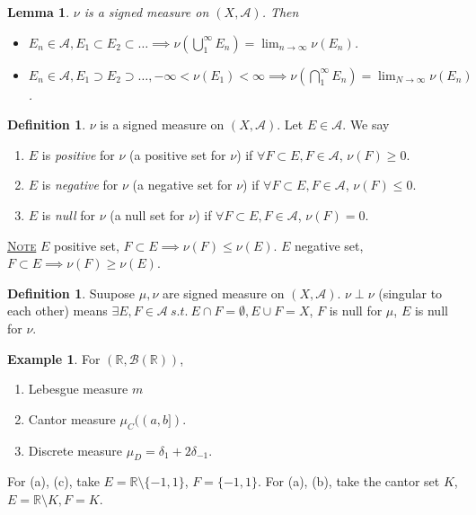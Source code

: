 \documentclass{report}
\newcommand{\R}{\mathbb{R}}
\newcommand{\st}{\ s.t.\ }
\newcommand{\cA}{\mathcal{A}}
\newcommand{\cB}{\mathcal{B}}
\newcommand{\fancyem}[1]{\underline{\textsc{#1}}}
\newtheorem{lemma}[theorem]{Lemma}
\theoremstyle{definition}
\newtheorem{definition}[theorem]{Definition}
\newtheorem{example}[theorem]{Example}
\theoremstyle{remark}
\begin{document}
\begin{lemma}
	$\nu$ is a signed measure on $(X, \cA)$. Then
	\begin{itemize}
		\item $E_n \in \cA, E_1 \subset E_2 \subset \ldots \implies \displaystyle \nu\left(\bigcup_1^\infty E_n\right) = \lim_{n \to \infty}\nu(E_n)$.
		\item $E_n \in \cA, E_1 \supset E_2 \supset \ldots, -\infty < \nu(E_1) < \infty \implies \displaystyle \nu\left(\bigcap_1^\infty E_n\right) = \lim_{N \to \infty} \nu(E_n)$.
	\end{itemize}
\end{lemma}

\begin{definition}
	$\nu$ is a signed measure on $(X, \cA)$. Let $E \in \cA$. We say \begin{enumerate}
		\item $E$ is \emph{positive} for $\nu$ (a positive set for $\nu$) if $\forall F \subset E, F \in \cA$, $\nu(F) \geq 0$.
		\item $E$ is \emph{negative} for $\nu$ (a negative set for $\nu$) if $\forall F \subset E, F \in \cA$, $\nu(F) \leq 0$.
		\item $E$ is \emph{null} for $\nu$ (a null set for $\nu$) if $\forall F \subset E, F \in \cA$, $\nu(F) = 0$.
	\end{enumerate}
\end{definition}

\fancyem{Note} $E$ positive set, $F \subset E \implies \nu(F) \leq \nu(E)$. $E$ negative set, $F \subset E \implies \nu(F) \geq \nu(E)$.

\begin{definition}
	Suupose $\mu, \nu$ are signed measure on $(X, \cA)$. $\nu \perp \nu$ (singular to each other) means $\exists E, F \in \cA \st E \cap F = \emptyset, E \cup F = X$, $F$ is null for $\mu$, $E$ is null for $\nu$.
\end{definition}
\begin{example}
	For $(\R, \cB(\R))$, \begin{enumerate}
		\item Lebesgue measure $m$
		\item Cantor measure $\mu_C((a, b])$.
		\item Discrete measure $\mu_D = \delta_1 + 2 \delta_{-1}$.
	\end{enumerate}
	For (a), (c), take $E = \R \setminus \{-1, 1\}$, $F = \{-1, 1\}$. For (a), (b), take the cantor set $K$, $E = \R \setminus K, F = K$.
\end{example}
\end{document}
